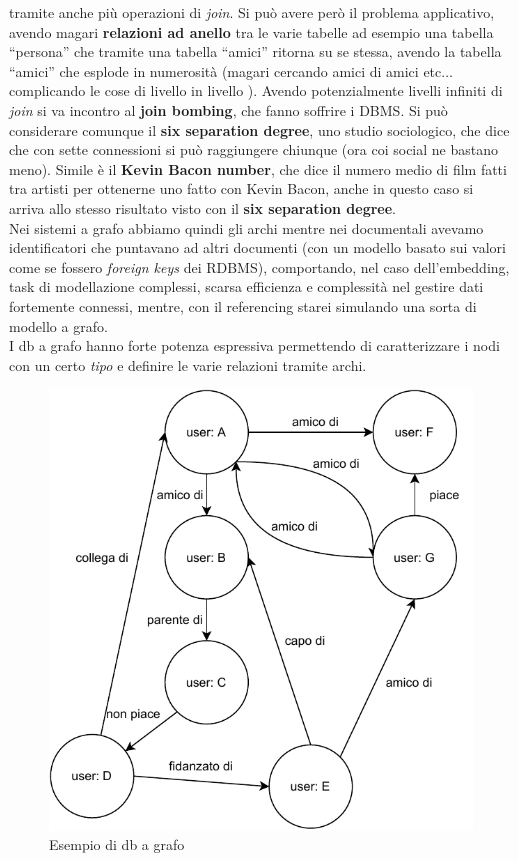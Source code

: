 \documentclass[a4paper,12pt, oneside]{book}
\begin{document}
tramite anche più operazioni di \textit{join}. Si può avere però il problema
applicativo, avendo magari\textbf{ relazioni ad anello} tra le varie tabelle
ad esempio una tabella ``persona'' che tramite una tabella ``amici'' ritorna su
se stessa, avendo la tabella ``amici'' che esplode in numerosità (magari
cercando amici di amici etc$\ldots$ complicando le cose di livello in
livello ). Avendo potenzialmente livelli infiniti di \textit{join} si va
incontro al \textbf{join bombing}, che fanno soffrire i DBMS. Si può considerare
comunque il \textbf{six separation degree}, uno studio sociologico, che dice
che con sette connessioni si può raggiungere chiunque (ora coi social ne bastano
meno). Simile è il \textbf{Kevin Bacon number}, che dice il numero medio di film
fatti tra artisti per ottenerne uno fatto con Kevin Bacon, anche in questo caso
si arriva allo stesso risultato visto con il \textbf{six separation degree}.\\
Nei sistemi a grafo abbiamo quindi gli archi mentre nei documentali avevamo
identificatori che puntavano ad altri documenti (con un modello basato sui
valori come se fossero \textit{foreign keys} dei RDBMS), comportando, nel caso
dell'embedding, task di modellazione complessi, scarsa efficienza e complessità
nel gestire dati fortemente connessi, mentre, con il referencing starei
simulando una sorta di modello a grafo. \\
I db a grafo hanno forte potenza espressiva permettendo di caratterizzare i nodi
con un certo \textit{tipo} e definire le varie relazioni tramite archi.
\begin{figure}
  \centering
  \includegraphics[scale = 0.7]{img/gdb.pdf}
  \caption{Esempio di db a grafo}
  \label{fig:gdb}
\end{figure}
\end{document}
